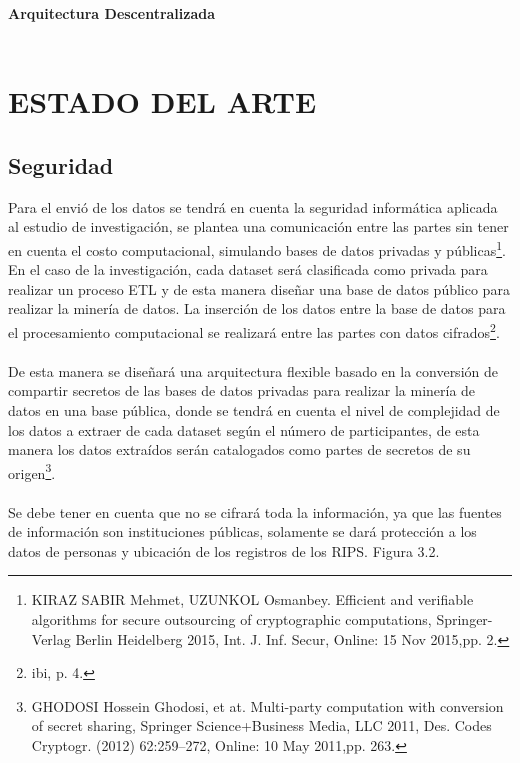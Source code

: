 \documentclass[a4paper,openright,12pt]{book}
\theoremstyle{definition}
\theoremstyle{remark}
\begin{document}
\textbf{Arquitectura Descentralizada}\\\\
\section{ESTADO DEL ARTE}
	\subsection{Seguridad}
Para el envió de los datos se tendrá en cuenta la seguridad informática aplicada al estudio de investigación, se plantea una comunicación entre las partes sin tener en cuenta el costo computacional, simulando bases de datos privadas y públicas\footnote{KIRAZ SABIR Mehmet, UZUNKOL Osmanbey. Efficient and verifiable algorithms for secure outsourcing of cryptographic computations, Springer-Verlag Berlin Heidelberg 2015, Int. J. Inf. Secur, Online: 15 Nov 2015,pp. 2.}. En el caso de la investigación, cada dataset será clasificada como privada para realizar un proceso ETL y de esta manera diseñar una base de datos público para realizar la minería de datos. La inserción de los datos entre la base de datos para el procesamiento computacional se realizará entre las partes con datos cifrados\footnote{ibi, p.  4.}.\\\\
De esta manera se diseñará una arquitectura flexible basado en la conversión de compartir secretos de las bases de datos privadas para realizar la minería de datos en una base pública, donde se tendrá en cuenta el nivel de complejidad de los datos a extraer de cada dataset según el número de participantes, de esta manera los datos extraídos serán catalogados como partes de secretos de su origen\footnote{GHODOSI Hossein Ghodosi, et at. Multi-party computation with conversion of secret sharing, Springer Science+Business Media, LLC 2011, Des. Codes Cryptogr. (2012) 62:259–272, Online: 10 May 2011,pp. 263.}.\\\\
Se debe tener en cuenta que no se cifrará toda la información, ya que las fuentes de información son instituciones públicas, solamente se dará protección a los datos de personas y ubicación de los registros de los RIPS. Figura 3.2.
\end{document}
